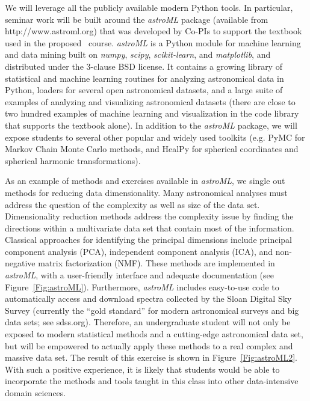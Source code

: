 We will leverage all the publicly available modern Python tools. In
particular, seminar work will be built around the {\it astroML}
package (available from http://www.astroml.org) that was developed by
Co-PIs to support the textbook used in the proposed \astrocl\
course. {\it astroML} is a Python module for machine learning and data
mining built on {\it numpy}, {\it scipy}, {\it scikit-learn}, and {\it
  matplotlib}, and distributed under the 3-clause BSD license. It
contains a growing library of statistical and machine learning
routines for analyzing astronomical data in Python, loaders for
several open astronomical datasets, and a large suite of examples of
analyzing and visualizing astronomical datasets (there are close to
two hundred examples of machine learning and visualization in the code
library that supports the textbook alone). In addition to the {\it
  astroML} package, we will expose students to several other popular
and widely used toolkits (e.g. PyMC for Markov Chain Monte Carlo
methods, and HealPy for spherical coordinates and spherical harmonic
transformations).

As an example of methods and exercises available in {\it astroML}, we
single out methods for reducing data dimensionality. Many astronomical
analyses must address the question of the complexity as well as size
of the data set. Dimensionality reduction methods address the
complexity issue by finding the directions within a multivariate data
set that contain most of the information. Classical approaches for
identifying the principal dimensions include principal component
analysis (PCA), independent component analysis (ICA), and non-negative
matrix factorization (NMF). These methods are implemented in {\it
  astroML}, with a user-friendly interface and adequate documentation
(see Figure~\ref{Fig:astroML}). Furthermore, {\it astroML} 
includes easy-to-use code to automatically access and download spectra
collected by the Sloan Digital Sky Survey (currently the ``gold
standard'' for modern astronomical surveys and big data sets; see
sdss.org).  Therefore, an undergraduate student will not only be
exposed to modern statistical methods and a cutting-edge astronomical
data set, but will be empowered to actually apply these methods to a
real complex and massive data set.  The result of this exercise is
shown in Figure~\ref{Fig:astroML2}.  With such a positive experience,
it is likely that students would be able to incorporate the methods
and tools taught in this class into other data-intensive domain sciences.


